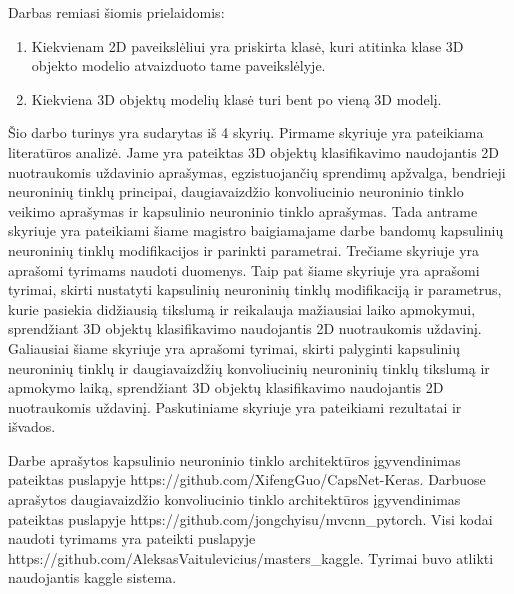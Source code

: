 Darbas remiasi šiomis prielaidomis:

\begin{enumerate}
	\item Kiekvienam 2D paveikslėliui yra priskirta klasė, kuri atitinka klase 3D objekto modelio atvaizduoto tame paveikslėlyje.
	\item Kiekviena 3D objektų modelių klasė turi bent po vieną 3D modelį.
\end{enumerate}

Šio darbo turinys yra sudarytas iš 4 skyrių. Pirmame skyriuje yra pateikiama literatūros analizė. Jame yra pateiktas 3D objektų klasifikavimo naudojantis 2D nuotraukomis uždavinio aprašymas, egzistuojančių sprendimų apžvalga, bendrieji neuroninių tinklų principai, daugiavaizdžio konvoliucinio neuroninio tinklo veikimo aprašymas ir kapsulinio neuroninio tinklo aprašymas.
Tada antrame skyriuje yra pateikiami šiame magistro baigiamajame darbe bandomų kapsulinių neuroninių tinklų modifikacijos ir parinkti parametrai.
Trečiame skyriuje yra aprašomi tyrimams naudoti duomenys.
Taip pat šiame skyriuje yra aprašomi tyrimai, skirti nustatyti kapsulinių neuroninių tinklų modifikaciją ir parametrus, kurie pasiekia didžiausią tikslumą ir reikalauja mažiausiai laiko apmokymui, sprendžiant 3D objektų klasifikavimo naudojantis 2D nuotraukomis uždavinį.
Galiausiai šiame skyriuje yra aprašomi tyrimai, skirti palyginti kapsulinių neuroninių tinklų ir daugiavaizdžių konvoliucinių neuroninių tinklų tikslumą ir apmokymo laiką, sprendžiant 3D objektų klasifikavimo naudojantis 2D nuotraukomis uždavinį.
Paskutiniame skyriuje yra pateikiami rezultatai ir išvados.

Darbe \cite{capsNet} aprašytos kapsulinio neuroninio tinklo architektūros įgyvendinimas pateiktas puslapyje https://github.com/XifengGuo/CapsNet-Keras. Darbuose \cite{cnnExp1, cnnExp2} aprašytos daugiavaizdžio konvoliucinio tinklo architektūros įgyvendinimas pateiktas puslapyje https://github.com/jongchyisu/mvcnn\_pytorch. Visi kodai naudoti tyrimams yra pateikti puslapyje https://github.com/AleksasVaitulevicius/masters\_kaggle. Tyrimai buvo atlikti naudojantis kaggle sistema.
